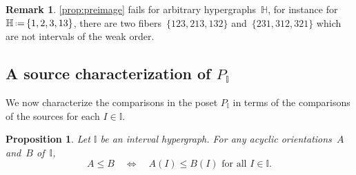 \documentclass[reqno]{amsart}
\newtheorem{proposition}[theorem]{Proposition}
\theoremstyle{definition}
\newtheorem{remark}[theorem]{Remark}
\newcommand{\eqdef}{\mbox{\,\raisebox{0.2ex}{\scriptsize\ensuremath{\mathrm:}}\ensuremath{=}\,}} %
\newcommand{\HH}{\mathbb H}  %
\newcommand{\II}{\mathbb I} %
\begin{document}
\begin{remark}
\cref{prop:preimage} fails for arbitrary hypergraphs~$\HH$, for instance for~$\HH \eqdef \{1,2,3,13\}$, there are two fibers~$\{123, 213, 132\}$ and~$\{231, 312, 321\}$ which are not intervals of the weak order.
\end{remark}


\subsection{A source characterization of $P_\II$}  
\label{subsec:sourceinc}

We now characterize the comparisons in the poset $P_\II$ in terms of the comparisons of the sources for each $I\in \II$.

\begin{proposition}
\label{prop:sourceorder}
Let $\II$ be an interval  hypergraph.
For any acyclic orientations~$A$ and~$B$ of~$\II$,
\[
A \le B \quad \iff \quad A(I) \le B(I) \text{ for all } I \in \II .
\]
\end{proposition}
\end{document}
